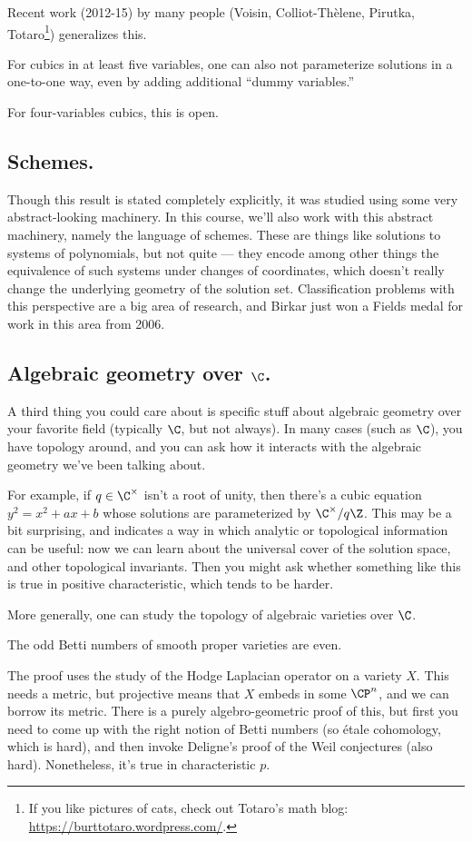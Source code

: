 Recent work (2012-15) by many people (Voisin, Colliot-Thèlene, Pirutka, Totaro\footnote{If you like pictures of
cats, check out Totaro's math blog: \url{https://burttotaro.wordpress.com/}.}) generalizes this.
\begin{thm}
For cubics in at least five variables, one can also not parameterize solutions in a one-to-one way, even by adding
additional ``dummy variables.''
\end{thm}
For four-variables cubics, this is open.
\subsection*{Schemes.}
Though this result is stated completely explicitly, it was studied using some very abstract-looking machinery. In
this course, we'll also work with this abstract machinery, namely the language of schemes. These are things like
solutions to systems of polynomials, but not quite --- they encode among other things the equivalence of such
systems under changes of coordinates, which doesn't really change the underlying geometry of the solution set.
Classification problems with this perspective are a big area of research, and Birkar just won a Fields medal for
work in this area from 2006.
\subsection*{Algebraic geometry over $\C$.}
A third thing you could care about is specific stuff about algebraic geometry over your favorite field (typically
$\C$, but not always). In many cases (such as $\C$), you have topology around, and you can ask how it interacts
with the algebraic geometry we've been talking about.

For example, if $q\in\C^\times$ isn't a root of unity, then there's a cubic equation $y^2 = x^2+ax+b$ whose
solutions are parameterized by $\C^\times/q\Z$. This may be a bit surprising, and indicates a way in which analytic
or topological information can be useful: now we can learn about the universal cover of the solution space, and
other topological invariants. Then you might ask whether something like this is true in positive characteristic,
which tends to be harder.

More generally, one can study the topology of algebraic varieties over $\C$.
\begin{thm}
The odd Betti numbers of smooth proper varieties are even.
\end{thm}
The proof uses the study of the Hodge Laplacian operator on a variety $X$. This needs a metric, but projective
means that $X$ embeds in some $\CP^n$, and we can borrow its metric. There is a purely algebro-geometric proof of
this, but first you need to come up with the right notion of Betti numbers (so étale cohomology, which is hard),
and then invoke Deligne's proof of the Weil conjectures (also hard).  Nonetheless, it's true in characteristic $p$.

